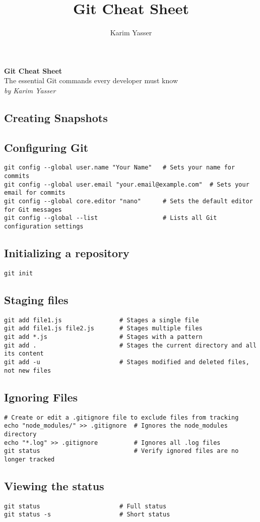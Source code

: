 \documentclass[a4paper,10pt]{article}
\title{Git Cheat Sheet}
\author{Karim Yasser}
\date{}
\newcommand{\sectiontitle}[1]{%
    \begin{center}
        \section*{#1}
    \end{center}
    \vspace{-0.5em}
}
\newcommand{\subsectiontitle}[1]{\subsection*{#1}\vspace{-0.3em}}
\begin{document}
\begin{center}
    \vspace*{10cm} %
    {\Huge \textbf{Git Cheat Sheet}} \\[1cm] %
    {\Large The essential Git commands every developer must know} \\[1cm] %
    \vspace{0.5cm}
    \textit{by Karim Yasser} %
    \vspace{2cm} %
\end{center}
\newpage

\sectiontitle{Creating Snapshots}
\subsectiontitle{Configuring Git}
\begin{verbatim}
git config --global user.name "Your Name"   # Sets your name for commits
git config --global user.email "your.email@example.com"  # Sets your email for commits
git config --global core.editor "nano"      # Sets the default editor for Git messages
git config --global --list                  # Lists all Git configuration settings
\end{verbatim}

\subsectiontitle{Initializing a repository}
\begin{verbatim}
git init
\end{verbatim}

\subsectiontitle{Staging files}
\begin{verbatim}
git add file1.js                # Stages a single file
git add file1.js file2.js       # Stages multiple files
git add *.js                    # Stages with a pattern
git add .                       # Stages the current directory and all its content
git add -u                      # Stages modified and deleted files, not new files
\end{verbatim}

\subsectiontitle{Ignoring Files}
\begin{verbatim}
# Create or edit a .gitignore file to exclude files from tracking
echo "node_modules/" >> .gitignore  # Ignores the node_modules directory
echo "*.log" >> .gitignore          # Ignores all .log files
git status                          # Verify ignored files are no longer tracked
\end{verbatim}

\subsectiontitle{Viewing the status}
\begin{verbatim}
git status                      # Full status
git status -s                   # Short status
\end{verbatim}
\end{document}
